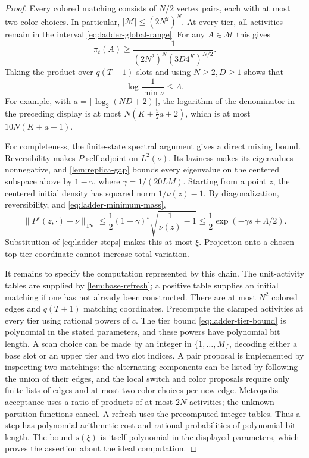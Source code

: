 \documentclass[11pt]{article}
\theoremstyle{definition}
\theoremstyle{remark}
\DeclareMathOperator{\TV}{TV}
\newcommand{\calM}{\mathcal M}
\numberwithin{equation}{section}
\begin{document}
\begin{proof}
Every colored matching consists of $N/2$ vertex pairs, each with at
most two color choices. In particular, $|\calM|\le(2N^2)^N$.
At every tier, all activities remain in the interval
\cref{eq:ladder-global-range}. For any $A\in\calM$ this gives
\[
 \pi_t(A)\ge
 \frac1{(2N^2)^N(3D4^K)^{N/2}}.
\]
Taking the product over $q(T+1)$ slots and using $N\ge2,D\ge1$
shows that
\begin{equation}\label{eq:ladder-minimum-mass}
 \log\frac1{\min\nu}\le\Lambda.
\end{equation}
For example, with $a=\lceil\log_2(ND+2)\rceil$, the logarithm of the
denominator in the preceding display is at most
$N(K+\tfrac52a+2)$, which is at most $10N(K+a+1)$.

For completeness, the finite-state spectral argument gives a direct
mixing bound. Reversibility makes $P$ self-adjoint on $L^2(\nu)$.
Its laziness makes its eigenvalues nonnegative, and
\cref{lem:replica-gap} bounds every eigenvalue on the centered subspace above by
$1-\gamma$, where $\gamma=1/(20LM)$.
Starting from a point $z$, the centered initial density has squared
norm $1/\nu(z)-1$. By diagonalization, reversibility, and
\cref{eq:ladder-minimum-mass},
\[
 \|P^s(z,\cdot)-\nu\|_{\TV}
 \le\frac12(1-\gamma)^s\sqrt{\frac1{\nu(z)}-1}
 \le\frac12\exp(-\gamma s+\Lambda/2).
\]
Substitution of \cref{eq:ladder-steps} makes this at most $\xi$.
Projection onto a chosen top-tier coordinate cannot increase total
variation.

It remains to specify the computation represented by this chain.
The unit-activity tables are supplied by \cref{lem:base-refresh}; a
positive table supplies an initial matching if one has not already
been constructed. There are at most $N^2$ colored edges and
$q(T+1)$ matching coordinates. Precompute the clamped activities at
every tier using rational powers of $c$. The tier bound
\cref{eq:ladder-tier-bound} is polynomial in the stated parameters,
and these powers have polynomial bit length.
A scan choice can be made by an integer in $\{1,\ldots,M\}$,
decoding either a base slot or an upper tier and two slot indices.
A pair proposal is implemented by inspecting two matchings: the
alternating components can be listed by following the union of their
edges, and the local switch and color proposals require only finite
lists of edges and at most two color choices per new edge.
Metropolis acceptance uses a ratio of products of at most $2N$
activities; the unknown partition functions cancel. A refresh uses
the precomputed integer tables. Thus a step has polynomial arithmetic
cost and rational probabilities of polynomial bit length.
The bound $s(\xi)$ is itself polynomial in the displayed parameters,
which proves the assertion about the ideal computation.


\end{proof}
\end{document}
